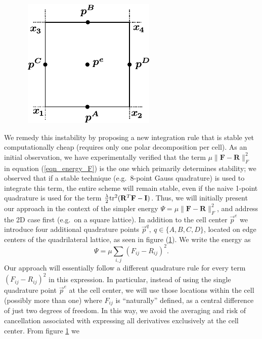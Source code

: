 \begin{figure}
\vspace{-.15in}
\mbox{
\hspace{-.3in}
\includegraphics[width=.3\columnwidth]{elasticity/figures/quadrature}
}
\label{fig_quadrature}
\vspace{-.25in}
\end{figure}
We remedy this instability by proposing a new integration rule that is
stable yet computationally cheap (requires only one polar decomposition per cell). As an initial observation, we have experimentally verified that the term $\mu\|\mathbf{F}-\mathbf{R}\|_F^2$ in equation (\ref{eqn_energy_F}) is
the one which primarily determines stability; we observed that if a stable technique (e.g.\ 8-point Gauss quadrature) is used to integrate this term, the entire scheme will remain
stable, even if the naive 1-point quadrature is used for the term  $\frac{\lambda}{2}\mbox{tr}^2(\mathbf{R}^T\mathbf{F}-\mathbf{I})$. Thus, we will initially present our approach in the context
of the simpler energy $\Psi=\mu\|\mathbf{F}-\mathbf{R}\|_F^2$, and address the 2D case first (e.g.\ on a square lattice). In addition to the cell center $\vec{p}^e$ we introduce four
additional quadrature points $\vec{p}^q,\ q\in\{A,B,C,D\}$, located on edge centers of the quadrilateral lattice, as seen in figure (\ref{fig_quadrature}). We write the energy as
\begin{equation}
\Psi=\mu\sum_{i,j}
  (F_{ij}-R_{ij})^2.
\label{eqn_energy_only_mu}
\end{equation}
Our approach will essentially follow a different quadrature rule for every term $(F_{ij}-R_{ij})^2$ in this expression. In particular, instead of using the single quadrature point
$\vec{p}^e$ at the cell center, we will use those locations within the cell (possibly more than one) where $F_{ij}$ is ``naturally'' defined, as a central difference of just two degrees
of freedom. In this way, we avoid the averaging and risk of cancellation associated with expressing all derivatives exclusively at the cell center. From figure \ref{fig_quadrature} we
